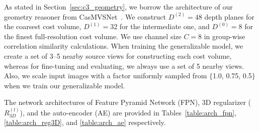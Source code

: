 As stated in Section~\ref{sec:c3_geometry}, we borrow the architecture of our geometry reasoner from CasMVSNet~\cite{gu2020cascade}. We construct $D^{(2)} = 48$ depth planes for the coarsest cost volume, $D^{(1)} = 32$ for the intermediate one, and $D^{(0)} = 8$ for the finest full-resolution cost volume. We use channel size $C = 8$ in group-wise correlation similarity calculations. When training the generalizable model, we create a set of 3$\textrm{--}$5 nearby source views for constructing each cost volume, whereas for fine-tuning and evaluating, we always use a set of 5 nearby views. Also, we scale input images with a factor uniformly sampled from $\{$1.0, 0.75, 0.5$\}$ when we train our generalizable model.

The network architectures of Feature Pyramid Network (FPN), 3D regularizer ($R^{(l)}_{3D}$), and the auto-encoder (AE) are provided in Tables~\ref{table:arch_fpn}, \ref{table:arch_reg3D}, and \ref{table:arch_ae} respectively.

